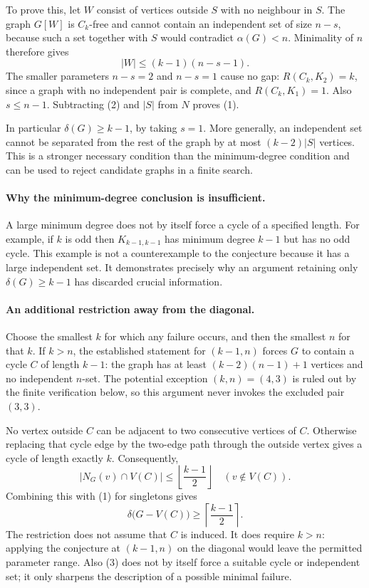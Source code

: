 To prove this, let $W$ consist of vertices outside $S$ with no neighbour in $S$. The graph $G[W]$ is $C_k$-free and cannot contain an independent set of size $n-s$, because such a set together with $S$ would contradict $\alpha(G)<n$. Minimality of $n$ therefore gives
\[
|W|\le(k-1)(n-s-1).
\tag{2}
\]
The smaller parameters $n-s=2$ and $n-s=1$ cause no gap: $R(C_k,K_2)=k$, since a graph with no independent pair is complete, and $R(C_k,K_1)=1$. Also $s\le n-1$. Subtracting (2) and $|S|$ from $N$ proves (1).

In particular $\delta(G)\ge k-1$, by taking $s=1$. More generally, an independent set cannot be separated from the rest of the graph by at most $(k-2)|S|$ vertices. This is a stronger necessary condition than the minimum-degree condition and can be used to reject candidate graphs in a finite search.

\paragraph{Why the minimum-degree conclusion is insufficient.}
A large minimum degree does not by itself force a cycle of a specified length. For example, if $k$ is odd then $K_{k-1,k-1}$ has minimum degree $k-1$ but has no odd cycle. This example is not a counterexample to the conjecture because it has a large independent set. It demonstrates precisely why an argument retaining only $\delta(G)\ge k-1$ has discarded crucial information.

\paragraph{An additional restriction away from the diagonal.}
Choose the smallest $k$ for which any failure occurs, and then the smallest $n$ for that $k$. If $k>n$, the established statement for $(k-1,n)$ forces $G$ to contain a cycle $C$ of length $k-1$: the graph has at least $(k-2)(n-1)+1$ vertices and no independent $n$-set. The potential exception $(k,n)=(4,3)$ is ruled out by the finite verification below, so this argument never invokes the excluded pair $(3,3)$.

No vertex outside $C$ can be adjacent to two consecutive vertices of $C$. Otherwise replacing that cycle edge by the two-edge path through the outside vertex gives a cycle of length exactly $k$. Consequently,
\[
|N_G(v)\cap V(C)|\le\left\lfloor\frac{k-1}{2}\right\rfloor
\quad(v\notin V(C)).
\]
Combining this with (1) for singletons gives
\[
\delta\bigl(G-V(C)\bigr)\ge\left\lceil\frac{k-1}{2}\right\rceil.
\tag{3}
\]
The restriction does not assume that $C$ is induced. It does require $k>n$: applying the conjecture at $(k-1,n)$ on the diagonal would leave the permitted parameter range. Also (3) does not by itself force a suitable cycle or independent set; it only sharpens the description of a possible minimal failure.

